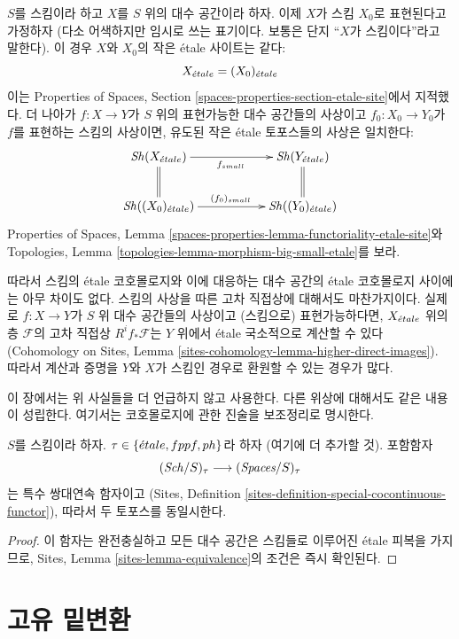 \medskip\noindent
$S$를 스킴이라 하고 $X$를 $S$ 위의 대수 공간이라 하자.
이제 $X$가 스킴 $X_0$로 표현된다고 가정하자
(다소 어색하지만 임시로 쓰는 표기이다. 보통은 단지 “$X$가
스킴이다”라고 말한다). 이 경우 $X$와 $X_0$의 작은
\'etale 사이트는 같다:
$$
X_{\acute{e}tale} = (X_0)_{\acute{e}tale}
$$
이는 Properties of Spaces, Section
\ref{spaces-properties-section-etale-site}에서 지적했다.
더 나아가 $f : X \to Y$가 $S$ 위의 표현가능한 대수 공간들의
사상이고 $f_0 : X_0 \to Y_0$가 $f$를 표현하는 스킴의 사상이면,
유도된 작은 \'etale 토포스들의 사상은 일치한다:
$$
\xymatrix{
\Sh(X_\etale) \ar[rr]_{f_{small}} \ar@{=}[d] & &
\Sh(Y_\etale) \ar@{=}[d] \\
\Sh((X_0)_\etale) \ar[rr]^{(f_0)_{small}} & &
\Sh((Y_0)_\etale)
}
$$
Properties of Spaces, Lemma
\ref{spaces-properties-lemma-functoriality-etale-site}와
Topologies, Lemma \ref{topologies-lemma-morphism-big-small-etale}를 보라.

\medskip\noindent
따라서 스킴의 \'etale 코호몰로지와 이에 대응하는 대수 공간의
\'etale 코호몰로지 사이에는 아무 차이도 없다.
스킴의 사상을 따른 고차 직접상에 대해서도 마찬가지이다.
실제로 $f : X \to Y$가 $S$ 위 대수 공간들의 사상이고
(스킴으로) 표현가능하다면, $X_{\acute{e}tale}$ 위의 층 $\mathcal{F}$의
고차 직접상 $R^if_*\mathcal{F}$는 $Y$ 위에서 \'etale 국소적으로
계산할 수 있다
(Cohomology on Sites, Lemma
\ref{sites-cohomology-lemma-higher-direct-images}).
따라서 계산과 증명을 $Y$와 $X$가 스킴인 경우로 환원할 수 있는
경우가 많다.

\medskip\noindent
이 장에서는 위 사실들을 더 언급하지 않고 사용한다.
다른 위상에 대해서도 같은 내용이 성립한다. 여기서는 코호몰로지에
관한 진술을 보조정리로 명시한다.

\begin{lemma}
\label{lemma-compare-cohomology-other-topologies}
$S$를 스킴이라 하자. $\tau \in \{{\acute{e}tale}, fppf, ph\}$라 하자
(여기에 더 추가할 것).
포함함자
$$
(\mathit{Sch}/S)_\tau \longrightarrow (\textit{Spaces}/S)_\tau
$$
는 특수 쌍대연속 함자이고
(Sites, Definition \ref{sites-definition-special-cocontinuous-functor}),
따라서 두 토포스를 동일시한다.
\end{lemma}

\begin{proof}
이 함자는 완전충실하고 모든 대수 공간은 스킴들로 이루어진
\'etale 피복을 가지므로, Sites, Lemma
\ref{sites-lemma-equivalence}의 조건은 즉시 확인된다.
\end{proof}






\section{고유 밑변환}
\label{section-proper-base-change}

